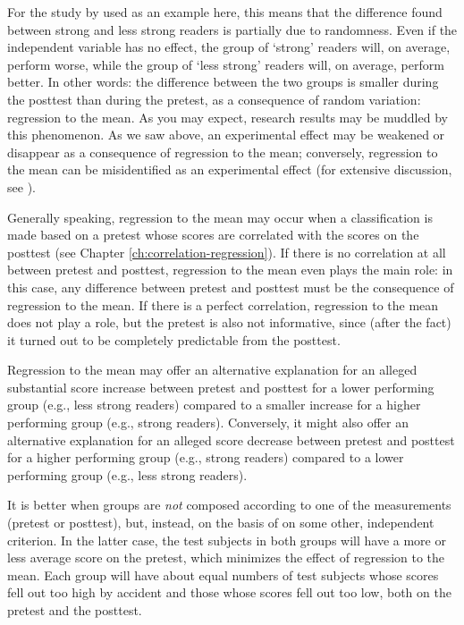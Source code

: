\documentclass[
]{book}
\begin{document}
For the study by \citet{Dona83} used as an example here, this means that the difference found between strong and less strong readers is partially due to randomness. Even if the independent variable has no effect, the group of `strong' readers will, on average, perform worse, while the group of `less strong' readers will, on average, perform better. In other words: the difference between the two groups is smaller during the posttest than during the pretest, as a consequence of random variation: regression to the mean. As you may expect, research results may be muddled by this phenomenon. As we saw above, an experimental effect may be weakened or disappear as a consequence of regression to the mean; conversely, regression to the mean can be misidentified as an experimental effect (for extensive discussion, see \citet{RMP18}).

Generally speaking, regression to the mean may occur when a classification is made based on a pretest whose scores are correlated with the scores on the posttest (see Chapter \ref{ch:correlation-regression}). If there is no correlation at all between pretest and posttest, regression to the mean even plays the main role: in this case, any difference between pretest and posttest must be the consequence of regression to the mean. If there is a perfect correlation, regression to the mean does not play a role, but the pretest is also not informative, since (after the fact) it turned out to be completely predictable from the posttest.

Regression to the mean may offer an alternative explanation for an alleged substantial score increase between pretest and posttest for a lower performing group (e.g., less strong readers) compared to a smaller increase for a higher performing group (e.g., strong readers). Conversely, it might also offer an alternative explanation for an alleged score decrease between pretest and posttest for a higher performing group (e.g., strong readers) compared to a lower performing group (e.g., less strong readers).

It is better when groups are \emph{not} composed according to one of the measurements (pretest or posttest), but, instead, on the basis of on some other, independent criterion. In the latter case, the test subjects in both groups will have a more or less average score on the pretest, which minimizes the effect of regression to the mean. Each group will have about equal numbers of test subjects whose scores fell out too high by accident and those whose scores fell out too low, both on the pretest and the posttest.
\end{document}

